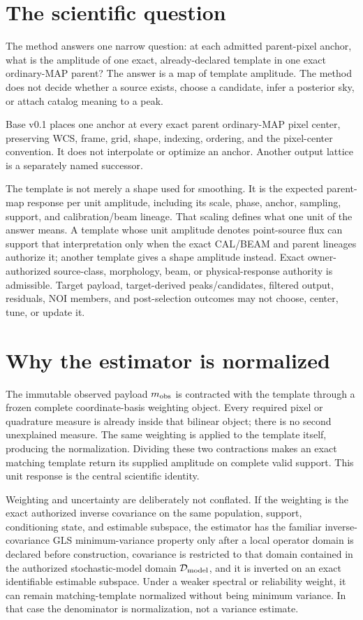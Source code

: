 \documentclass[11pt]{article}
\begin{document}
\section{The scientific question}

The method answers one narrow question: at each admitted parent-pixel anchor, what is
the amplitude of one exact, already-declared template in one exact ordinary-MAP
parent? The answer is a map of template amplitude. The method does not decide
whether a source exists, choose a candidate, infer a posterior sky, or attach
catalog meaning to a peak.

Base v0.1 places one anchor at every exact parent ordinary-MAP pixel center,
preserving WCS, frame, grid, shape, indexing, ordering, and the pixel-center
convention. It does not interpolate or optimize an anchor. Another output
lattice is a separately named successor.

The template is not merely a shape used for smoothing. It is the expected
parent-map response per unit amplitude, including its scale, phase, anchor,
sampling, support, and calibration/beam lineage. That scaling defines what one
unit of the answer means. A template whose unit amplitude denotes point-source
flux can support that interpretation only when the exact CAL/BEAM and parent
lineages authorize it; another template gives a shape amplitude instead.
Exact owner-authorized source-class, morphology, beam, or physical-response
authority is admissible. Target payload, target-derived peaks/candidates,
filtered output, residuals, NOI members, and post-selection outcomes may not
choose, center, tune, or update it.

\section{Why the estimator is normalized}

The immutable observed payload $m_{\rm obs}$ is contracted with the template
through a frozen complete
coordinate-basis weighting object. Every required pixel or quadrature measure
is already inside that bilinear object; there is no second unexplained measure.
The same weighting is applied to the template itself, producing the
normalization. Dividing these two contractions makes an exact matching
template return its supplied amplitude on complete valid support. This unit
response is the central scientific identity.

Weighting and uncertainty are deliberately not conflated. If the weighting is
the exact authorized inverse covariance on the same population, support,
conditioning state, and estimable subspace, the estimator has the familiar
inverse-covariance GLS minimum-variance property only after a local operator
domain is declared before construction, covariance is restricted to that
domain contained in the authorized stochastic-model domain
$\mathcal D_{\rm model}$,
and it is inverted on an exact identifiable
estimable subspace. Under a weaker spectral or
reliability weight, it can remain matching-template normalized without being
minimum variance. In that case the denominator is normalization, not a
variance estimate.
\end{document}
